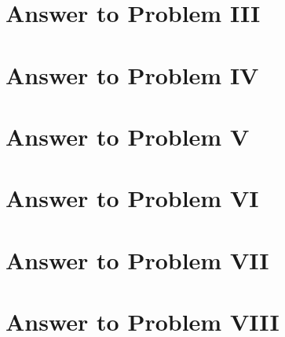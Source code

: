 \documentclass[11pt,a4paper]{article}
\begin{document}
\clearpage

\section{Answer to Problem III}\label{sec:P03}



\clearpage

\section{Answer to Problem IV}\label{sec:P04}



\clearpage

\section{Answer to Problem V}\label{sec:P05}



\clearpage

\section{Answer to Problem VI}\label{sec:P06}



\clearpage

\section{Answer to Problem VII}\label{sec:P07}



\clearpage

\section{Answer to Problem VIII}\label{sec:P08}



\clearpage
\end{document}
